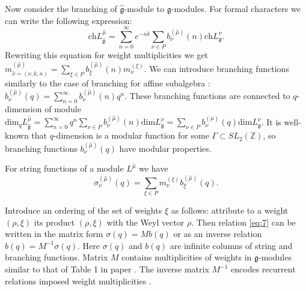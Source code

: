 \documentclass[12pt]{article}
\newcommand{\gf}{\mathfrak{g}}
\newcommand{\gfh}{\hat{\mathfrak{g}}}
\begin{document}
Now consider the branching of $\gfh$-module to $\gf$-modules. For
formal characters we can write the following expression:
\begin{equation}
  \label{eq:8}
\mathrm{ch}L^{\hat{\mu}}_{\gfh}=\sum_{n=0}^{\infty}e^{-n\delta} \sum_{\nu\in P} b^{(\hat{\mu})}_{\nu}(n) \mathrm{ch} L^{\nu}_{\gf}.
\end{equation}
Rewriting this equation for weight multiplicities we get
$m^{(\hat{\mu})}_{\hat{\nu}=(\nu,k,n)}=\sum_{\xi\in P}
b^{(\hat{\mu})}_{\xi}(n) m^{(\xi)}_{\nu}$. We can introduce
branching functions similarly to the case of branching for affine
subalgebra \cite{kac1988modular,kac1990idl}:
$b^{(\hat{\mu})}_{\nu}(q)=\sum_{n=0}^{\infty}
b^{(\hat{\mu})}_{\nu}(n) q^{n}$.  These branching functions are connected to $q$-dimension of module $\mathrm{dim}_{q}L^{\hat \mu}_{\gfh}=\sum_{n=0}^{\infty}q^{n}\sum_{\nu\in P} b^{(\hat \mu)}_{\nu}(n) \mathrm{dim }L^{\nu}_{\gf}=\sum_{\nu\in P}b^{(\hat\mu)}_{\nu}(q) \mathrm{dim} L^{\nu}_{\gf}$. It is well-known \cite{gannon2006moonshine} that $q$-dimension is a modular function for some $\Gamma\subset SL_{2}(\mathbb{Z})$, so branching functions $b^{(\hat \mu)}_{\nu}(q)$ have modular properties.

 For string functions of a module
$L^{\hat{\mu}}$ we have
\begin{equation}
  \label{eq:7}
   \sigma^{(\hat{\mu})}_{\nu}(q) = \sum_{\xi\in P} m^{(\xi)}_{\nu} b^{(\hat{\mu})}_{\xi}(q).
\end{equation}

Introduce an ordering of the set of weights $\xi$ as follows:
attribute to a weight $(\rho,\xi)$ its product $(\rho,\xi)$ with
the Weyl vector $\rho$. Then relation \eqref{eq:7} can be written
in the matrix form $\sigma(q)=M b(q)$ or as an inverse relation
$b(q)=M^{-1}\sigma(q)$. Here $\sigma(q)$ and $b(q)$ are infinite
columns of string and branching functions. Matrix $M$ contains
multiplicities of weights in $\gf$-modules similar to that of
Table 1 in paper \cite{2010arXiv1001}. The inverse matrix $M^{-1}$
encodes recurrent relations imposed weight multiplicities
\cite{il2010folded}.
\end{document}
